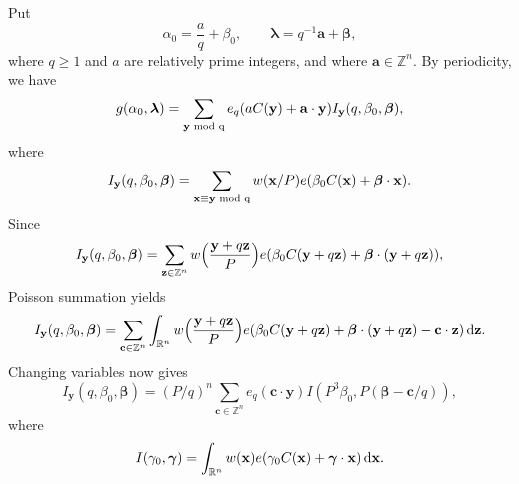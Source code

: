 \documentclass[12pt,reqno]{amsart}
\theoremstyle{definition}
\theoremstyle{remark}
\numberwithin{equation}{section}
\begin{document}
Put
\begin{equation} \label{put}
{{\alpha}}_0 = \frac a q + {{\beta}}_0, \qquad {{\boldsymbol {{\lambda}}}} = q^{-1} {\mathbf a} + {\boldsymbol{\beta}},
\end{equation}
where $q {\geqslant} 1$ and $a$ are relatively prime integers, and where ${\mathbf a} \in {\mathbb Z}^n$. By periodicity, we have
\[
g({{\alpha}}_0,{{\boldsymbol {{\lambda}}}}) = \sum_{{\mathbf y} {\,\,\rm{mod}\,\,q}} e_q (aC({\mathbf y}) + {\mathbf a} \cdot {\mathbf y}) I_{\mathbf y} (q,{{\beta}}_0,{\boldsymbol{\beta}}),
\]
where
\[
I_{\mathbf y}(q,{{\beta}}_0,{\boldsymbol{\beta}}) = \sum_{{\mathbf x} \equiv {\mathbf y} {\,\,\rm{mod}\,\,q}} w({\mathbf x}/P) e({{\beta}}_0 C({\mathbf x}) + {\boldsymbol{\beta}} \cdot {\mathbf x}).
\]
Since
\[
I_{\mathbf y}(q,{{\beta}}_0,{\boldsymbol{\beta}}) = \sum_{{\mathbf z} \in {\mathbb Z}^n} w \Bigl(\frac{{\mathbf y} + q {\mathbf z}}P \Bigr) 
e({{\beta}}_0 C({\mathbf y} + q {\mathbf z}) + {\boldsymbol{\beta}} \cdot ({\mathbf y} + q {\mathbf z})),
\]
Poisson summation yields
\[
I_{\mathbf y}(q,{{\beta}}_0,{\boldsymbol{\beta}}) = \sum_{{\mathbf c} \in {\mathbb Z}^n} \int_{{\mathbb R}^n} w \Bigl(\frac{{\mathbf y} + q {\mathbf z}}P \Bigr) 
e({{\beta}}_0 C({\mathbf y} + q {\mathbf z}) + {\boldsymbol{\beta}} \cdot ({\mathbf y} + q {\mathbf z}) - {\mathbf c} \cdot {\mathbf z}) {{\,{\rm d}}}{\mathbf z}.
\]
Changing variables now gives
\[
I_{\mathbf y}(q,{{\beta}}_0,{\boldsymbol{\beta}}) = (P/q)^n \sum_{{\mathbf c} \in {\mathbb Z}^n} e_q({\mathbf c} \cdot {\mathbf y}) 
I(P^3 {{\beta}}_0, P({\boldsymbol{\beta}} - {\mathbf c} / q)),
\]
where
\begin{equation} \label{intdef}
I({{\gamma}}_0, {\boldsymbol{{\gamma}}}) = 
\int_{{\mathbb R}^n} w ({\mathbf x}) e({{\gamma}}_0 C({\mathbf x}) + {\boldsymbol{{\gamma}}} \cdot {\mathbf x}) {{\,{\rm d}}} {\mathbf x}.
\end{equation}
\end{document}
